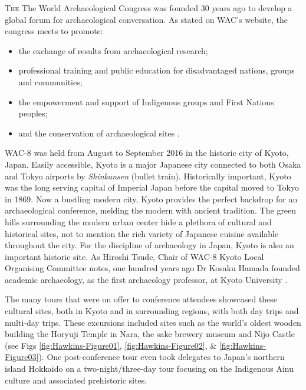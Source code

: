 \documentclass[spanish]{ijsra}
\begin{document}
\IJSRAopening
\lettrine{T}{he} The World Archaeological Congress was founded 30 years ago to develop a global forum for archaeological conversation. As stated on WAC’s website, the congress meets to promote:
\begin{itemize}
	\item the exchange of results from archaeological research;
	\item professional training and public education for disadvantaged nations, groups and communities;
	\item the empowerment and support of Indigenous groups and First Nations peoples;
	\item and the conservation of archaeological sites \parencite{aboutWAC}.
\end{itemize}

WAC-8 was held from August  to September  2016 in the historic city of Kyoto, Japan. Easily accessible, Kyoto is a major Japanese city connected to both Osaka and Tokyo airports by \textit{Shinkansen} (bullet train). Historically important, Kyoto was the long serving capital of Imperial Japan before the capital moved to Tokyo in 1869. Now a bustling modern city, Kyoto provides the perfect backdrop for an archaeological conference, melding the modern with ancient tradition. The green hills surrounding the modern urban center hide a plethora of cultural and historical sites, not to mention the rich variety of Japanese cuisine available throughout the city. For the discipline of archaeology in Japan, Kyoto is also an important historic site. As Hiroshi Tsude, Chair of WAC-8 Kyoto Local Organising Committee notes, one hundred years ago Dr Kosaku Hamada founded academic archaeology, as the first archaeology professor, at Kyoto University \parencite{welcomeWAC}. 

The many tours that were on offer to conference attendees showcased these cultural sites, both in Kyoto and in surrounding regions, with both day trips and multi-day trips. These excursions included sites such as the world’s oldest wooden building the Horyuji Temple in Nara, the sake brewery museum and Nijo Castle (see Figs \ref{fig:Hawkins-Figure01}, \ref{fig:Hawkins-Figure02}, \& \ref{fig:Hawkins-Figure03}). One post-conference tour even took delegates to Japan’s northern island Hokkaido on a two-night/three-day tour focusing on the Indigenous Ainu culture and associated prehistoric sites.
\end{document}
